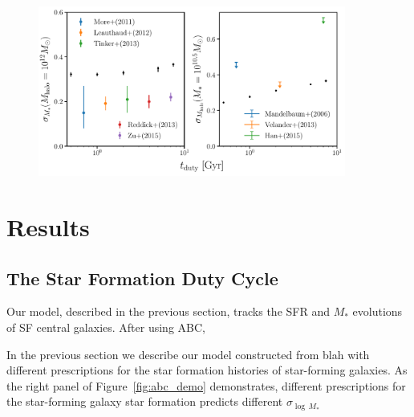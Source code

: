 \documentclass[12pt, letterpaper, preprint]{aastex}
\begin{document}
\begin{figure}
\begin{center}
\includegraphics[width=0.9\textwidth]{figs/SHMRscatter_tduty.pdf}
\caption{}
\label{fig:sigMstar_duty}
\end{center}
\end{figure}

\section{Results}
\subsection{The Star Formation Duty Cycle}
Our model, described in the previous section, tracks the SFR and $M_*$ 
evolutions of SF central galaxies. After using ABC, 



In the previous section we describe our model constructed from blah with different
prescriptions for the star formation histories of star-forming galaxies. As the 
right panel of Figure~\ref{fig:abc_demo} demonstrates, different prescriptions for 
the star-forming galaxy star formation predicts different $\sigma_{\log\,M_*}$ 
\end{document}
